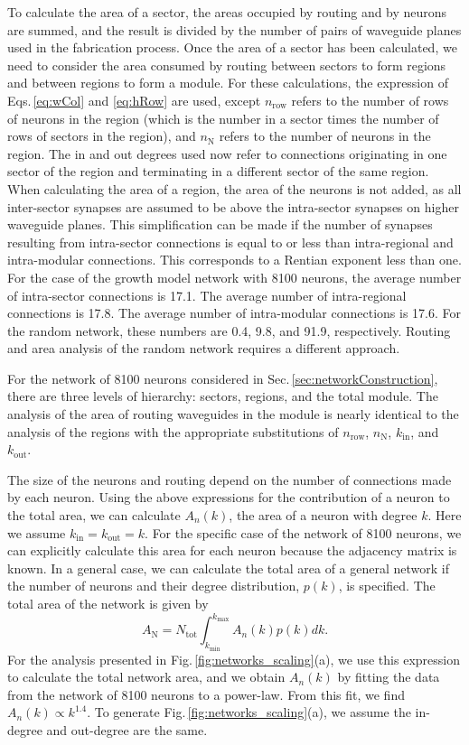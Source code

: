 \documentclass[twocolumn]{article}
\begin{document}
To calculate the area of a sector, the areas occupied by routing and by neurons are summed, and the result is divided by the number of pairs of waveguide planes used in the fabrication process. Once the area of a sector has been calculated, we need to consider the area consumed by routing between sectors to form regions and between regions to form a module. For these calculations, the expression of Eqs.\,\ref{eq:wCol} and \ref{eq:hRow} are used, except $n_{\mathrm{row}}$ refers to the number of rows of neurons in the region (which is the number in a sector times the number of rows of sectors in the region), and $n_{\mathrm{N}}$ refers to the number of neurons in the region. The in and out degrees used now refer to connections originating in one sector of the region and terminating in a different sector of the same region. When calculating the area of a region, the area of the neurons is not added, as all inter-sector synapses are assumed to be above the intra-sector synapses on higher waveguide planes. This simplification can be made if the number of synapses resulting from intra-sector connections is equal to or less than intra-regional and intra-modular connections. This corresponds to a Rentian exponent less than one. For the case of the growth model network with 8100 neurons, the average number of intra-sector connections is 17.1. The average number of intra-regional connections is 17.8. The average number of intra-modular connections is 17.6. For the random network, these numbers are 0.4, 9.8, and 91.9, respectively. Routing and area analysis of the random network requires a different approach.

For the network of 8100 neurons considered in Sec.\,\ref{sec:networkConstruction}, there are three levels of hierarchy: sectors, regions, and the total module. The analysis of the area of routing waveguides in the module is nearly identical to the analysis of the regions with the appropriate substitutions of $n_{\mathrm{row}}$, $n_{\mathrm{N}}$, $k_{\mathrm{in}}$, and $k_{\mathrm{out}}$.

The size of the neurons and routing depend on the number of connections made by each neuron. Using the above expressions for the contribution of a neuron to the total area, we can calculate $A_n(k)$, the area of a neuron with degree $k$. Here we assume $k_{\mathrm{in}} = k_{\mathrm{out}} = k$. For the specific case of the network of 8100 neurons, we can explicitly calculate this area for each neuron because the adjacency matrix is known. In a general case, we can calculate the total area of a general network if the number of neurons and their degree distribution, $p(k)$, is specified. The total area of the network is given by
\begin{equation}
\label{eq:networkArea}
A_{\mathrm{N}} = N_{\mathrm{tot}}\int_{k_{\mathrm{min}}}^{k_{\mathrm{max}}}A_n(k)p(k)dk.
\end{equation}
For the analysis presented in Fig.\,\ref{fig:networks_scaling}(a), we use this expression to calculate the total network area, and we obtain $A_n(k)$ by fitting the data from the network of 8100 neurons to a power-law. From this fit, we find $A_n(k)\propto k^{1.4}$. To generate Fig.\,\ref{fig:networks_scaling}(a), we assume the in-degree and out-degree are the same. 
\end{document}
